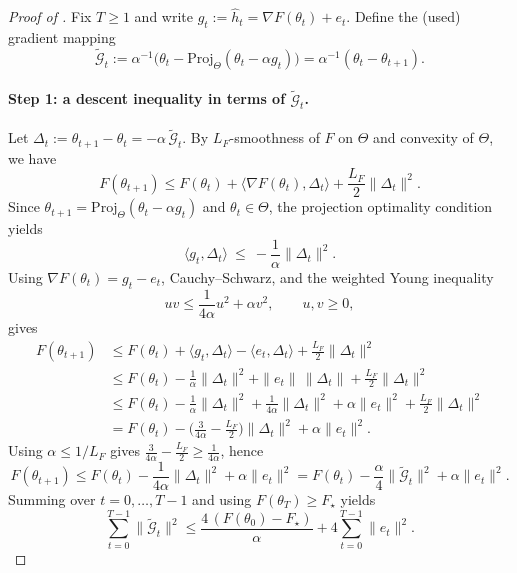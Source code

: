 \documentclass{article}
\theoremstyle{normaltheorem}
\begin{document}
\begin{proof}[Proof of ]
Fix $T\ge 1$ and write $g_t:=\widehat h_t=\nabla F(\theta_t)+e_t$.
Define the (used) gradient mapping
\[
\widetilde{\mathcal G}_t
:=\alpha^{-1}\big(\theta_t-\mathrm{Proj}_{\Theta}(\theta_t-\alpha g_t)\big)
=\alpha^{-1}(\theta_t-\theta_{t+1}).
\]

\paragraph{Step 1: a descent inequality in terms of $\widetilde{\mathcal G}_t$.}
Let $\Delta_t:=\theta_{t+1}-\theta_t=-\alpha\,\widetilde{\mathcal G}_t$.
By $L_F$-smoothness of $F$ on $\Theta$ and convexity of $\Theta$, we have
\[
F(\theta_{t+1})
\le
F(\theta_t)+\langle \nabla F(\theta_t),\Delta_t\rangle+\frac{L_F}{2}\|\Delta_t\|^2.
\]
Since $\theta_{t+1}=\mathrm{Proj}_{\Theta}(\theta_t-\alpha g_t)$ and $\theta_t\in\Theta$, the projection
optimality condition yields
\[
\langle g_t,\Delta_t\rangle\ \le\ -\frac{1}{\alpha}\|\Delta_t\|^2.
\]
	Using $\nabla F(\theta_t)=g_t-e_t$, Cauchy--Schwarz, and the weighted Young inequality
	\[
	uv\le \frac{1}{4\alpha}u^2+\alpha v^2,\qquad u,v\ge0,
	\]
	gives
\begin{align*}
F(\theta_{t+1})
&\le
F(\theta_t)+\langle g_t,\Delta_t\rangle-\langle e_t,\Delta_t\rangle+\frac{L_F}{2}\|\Delta_t\|^2\\
&\le
F(\theta_t)-\frac{1}{\alpha}\|\Delta_t\|^2+\|e_t\|\,\|\Delta_t\|+\frac{L_F}{2}\|\Delta_t\|^2\\
&\le
F(\theta_t)-\frac{1}{\alpha}\|\Delta_t\|^2+\frac{1}{4\alpha}\|\Delta_t\|^2+\alpha\|e_t\|^2+\frac{L_F}{2}\|\Delta_t\|^2\\
&=
F(\theta_t)-\Big(\frac{3}{4\alpha}-\frac{L_F}{2}\Big)\|\Delta_t\|^2+\alpha\|e_t\|^2.
\end{align*}
Using $\alpha\le 1/L_F$ gives $\frac{3}{4\alpha}-\frac{L_F}{2}\ge \frac{1}{4\alpha}$, hence
\[
F(\theta_{t+1})
\le
F(\theta_t)-\frac{1}{4\alpha}\|\Delta_t\|^2+\alpha\|e_t\|^2
=
F(\theta_t)-\frac{\alpha}{4}\|\widetilde{\mathcal G}_t\|^2+\alpha\|e_t\|^2.
\]
Summing over $t=0,\dots,T-1$ and using $F(\theta_T)\ge F_\star$ yields
\begin{equation}\label{eq:sum-Gtilde}
\sum_{t=0}^{T-1}\|\widetilde{\mathcal G}_t\|^2
\le
\frac{4\,(F(\theta_0)-F_\star)}{\alpha}
+4\sum_{t=0}^{T-1}\|e_t\|^2.
\end{equation}


\end{proof}
\end{document}
